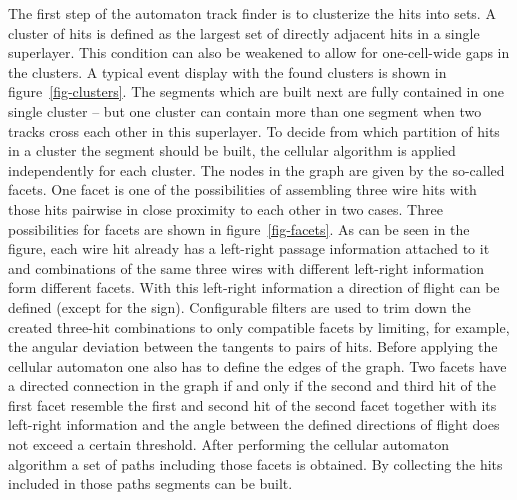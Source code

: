 The first step of the automaton track finder is to clusterize the hits into sets. A cluster of hits is defined as the largest set of directly adjacent hits in a single superlayer. This condition can also be weakened to allow for one-cell-wide gaps in the clusters. A typical event display with the found clusters is shown in figure~\ref{fig-clusters}. The segments which are built next are fully contained in one single cluster -- but one cluster can contain more than one segment when two tracks cross each other in this superlayer. To decide from which partition of hits in a cluster the segment should be built, the cellular algorithm is applied independently for each cluster. The nodes in the graph are given by the so-called facets. One facet is one of the possibilities of assembling three wire hits with those hits pairwise in close proximity to each other in two cases. Three possibilities for facets are shown in figure~\ref{fig-facets}. As can be seen in the figure, each wire hit already has a left-right passage information attached to it and combinations of the same three wires with different left-right information form different facets. With this left-right information a direction of flight can be defined (except for the sign). Configurable filters are used to trim down the created three-hit combinations to only compatible facets by limiting, for example, the angular deviation between the tangents to pairs of hits. Before applying the cellular automaton one also has to define the edges of the graph. Two facets have a directed connection in the graph if and only if the second and third hit of the first facet resemble the first and second hit of the second facet together with its left-right information and the angle between the defined directions of flight does not exceed a certain threshold. After performing the cellular automaton algorithm a set of paths including those facets is obtained. By collecting the hits included in those paths segments can be built.

